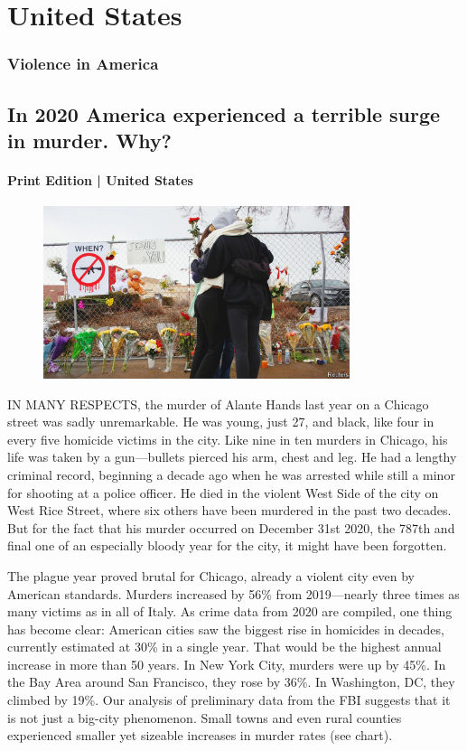 \documentclass{article}
\begin{document}
\section{United States }
\subsubsection{Violence in America }
\subsection{In 2020 America experienced a terrible surge in murder. Why? }
\paragraph{Print Edition | United States  \quad \color{gray}{Mar 27th 2021 }}
\begin{figure}[h]
\centering
\includegraphics[width=0.8\textwidth]{images/20210327_USP001_0.jpg}
\end{figure}
\lettrine{I}N MANY RESPECTS, the murder of Alante Hands last year on a Chicago street was sadly unremarkable. He was young, just 27, and black, like four in every five homicide victims in the city. Like nine in ten murders in Chicago, his life was taken by a gun---bullets pierced his arm, chest and leg. He had a lengthy criminal record, beginning a decade ago when he was arrested while still a minor for shooting at a police officer. He died in the violent West Side of the city on West Rice Street, where six others have been murdered in the past two decades. But for the fact that his murder occurred on December 31st 2020, the 787th and final one of an especially bloody year for the city, it might have been forgotten. 

The plague year proved brutal for Chicago, already a violent city even by American standards. Murders increased by 56\% from 2019---nearly three times as many victims as in all of Italy. As crime data from 2020 are compiled, one thing has become clear: American cities saw the biggest rise in homicides in decades, currently estimated at 30\% in a single year. That would be the highest annual increase in more than 50 years. In New York City, murders were up by 45\%. In the Bay Area around San Francisco, they rose by 36\%. In Washington, DC, they climbed by 19\%. Our analysis of preliminary data from the FBI suggests that it is not just a big-city phenomenon. Small towns and even rural counties experienced smaller yet sizeable increases in murder rates (see chart). 
\end{document}
